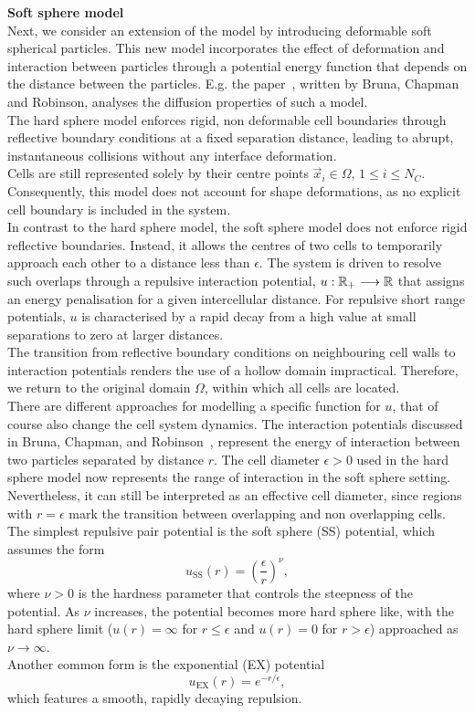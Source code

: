 \textbf{Soft sphere model} \\
Next, we consider an extension of the model by introducing deformable soft spherical particles. 
This new model incorporates the effect of deformation and interaction between particles through a potential energy function that depends on the distance between the particles.
E.g. the paper~\cite{Bruna2017}, written by Bruna, Chapman and Robinson, analyses the diffusion properties of such a model. \\
The hard sphere model enforces rigid, non deformable cell boundaries through reflective boundary conditions at a fixed separation distance, leading to abrupt, instantaneous collisions without any interface deformation. \\
Cells are still represented solely by their centre points $\vec{x}_i \in \Omega$, $1 \leq i \leq N_C$.
Consequently, this model does not account for shape deformations, as no explicit cell boundary is included in the system. \\
In contrast to the hard sphere model, the soft sphere model does not enforce rigid reflective boundaries. 
Instead, it allows the centres of two cells to temporarily approach each other to a distance less than $\epsilon$. 
The system is driven to resolve such overlaps through a repulsive interaction potential, $u: \mathbb{R}_+ \longrightarrow \mathbb{R}$ that assigns an energy penalisation for a given intercellular distance. 
For repulsive short range potentials, $u$ is characterised by a rapid decay from a high value at small separations to zero at larger distances. \\
The transition from reflective boundary conditions on neighbouring cell walls to interaction potentials renders the use of a hollow domain impractical.
Therefore, we return to the original domain $\Omega$, within which all cells are located. \\
There are different approaches for modelling a specific function for $u$, that of course also change the cell system dynamics. 
The interaction potentials discussed in Bruna, Chapman, and Robinson~\cite{Bruna2012}, represent the energy of interaction between two particles separated by distance $r$. 
The cell diameter $\epsilon > 0$ used in the hard sphere model now represents the range of interaction in the soft sphere setting. 
Nevertheless, it can still be interpreted as an effective cell diameter, since regions with $r = \epsilon$ mark the transition between overlapping and non overlapping cells. \\
The simplest repulsive pair potential is the soft sphere (SS) potential, which assumes the form
\[
	u_{\text{SS}}(r) = \left( \dfrac{\epsilon}{r}\right)^{\nu},
\]
where $\nu > 0$ is the hardness parameter that controls the steepness of the potential. 
As $\nu$ increases, the potential becomes more hard sphere like, with the hard sphere limit ($u(r) = \infty$ for $r \leq \epsilon$ and $u(r) = 0$ for $r > \epsilon$) approached as $\nu \to \infty$. \\
Another common form is the exponential (EX) potential 
\[
	u_{\text{EX}}(r) = e^{-r/\epsilon},
\]
which features a smooth, rapidly decaying repulsion. \\

